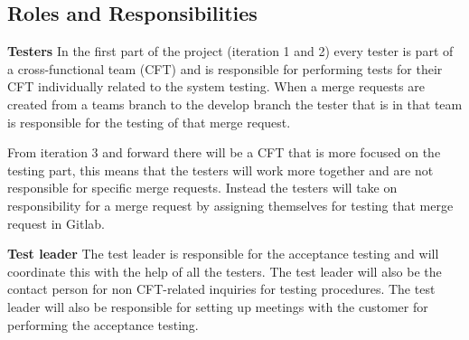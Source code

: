 \subsection{Roles and Responsibilities}

\textbf{Testers}\newline
\noindent In the first part of the project (iteration 1 and 2) every tester is part of a cross-functional team (CFT) and is responsible for performing tests for their CFT individually related to the system testing. When a merge requests are created from a teams branch to the develop branch the tester that is in that team is responsible for the testing of that merge request. \newline

\noindent From iteration 3 and forward there will be a CFT that is more focused on the testing part, this means that the testers will work more together and are not responsible for specific merge requests. Instead the testers will take on responsibility for a merge request by assigning themselves for testing that merge request in Gitlab. \newline

\noindent \textbf{Test leader}\newline
\noindent The test leader is responsible for  the  acceptance  testing  and  will coordinate  this  with  the  help  of  all  the  testers.  The  test leader will also be the contact person for non CFT-related inquiries for testing procedures. The test leader will also be responsible for setting up meetings with the customer for performing the acceptance testing.
